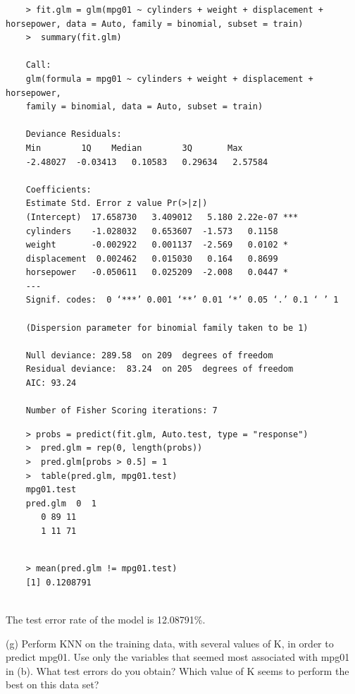 \documentclass{article}
\begin{document}
\begin{program}
	\begin{verbatim}	
	> fit.glm = glm(mpg01 ~ cylinders + weight + displacement + horsepower, data = Auto, family = binomial, subset = train)
	>  summary(fit.glm)
	
	Call:
	glm(formula = mpg01 ~ cylinders + weight + displacement + horsepower, 
	family = binomial, data = Auto, subset = train)
	
	Deviance Residuals: 
	Min        1Q    Median        3Q       Max  
	-2.48027  -0.03413   0.10583   0.29634   2.57584  
	
	Coefficients:
	Estimate Std. Error z value Pr(>|z|)    
	(Intercept)  17.658730   3.409012   5.180 2.22e-07 ***
	cylinders    -1.028032   0.653607  -1.573   0.1158    
	weight       -0.002922   0.001137  -2.569   0.0102 *  
	displacement  0.002462   0.015030   0.164   0.8699    
	horsepower   -0.050611   0.025209  -2.008   0.0447 *  
	---
	Signif. codes:  0 ‘***’ 0.001 ‘**’ 0.01 ‘*’ 0.05 ‘.’ 0.1 ‘ ’ 1
	
	(Dispersion parameter for binomial family taken to be 1)
	
	Null deviance: 289.58  on 209  degrees of freedom
	Residual deviance:  83.24  on 205  degrees of freedom
	AIC: 93.24
	
	Number of Fisher Scoring iterations: 7	
	\end{verbatim}
\end{program}

\begin{program}
	\begin{verbatim}	
	> probs = predict(fit.glm, Auto.test, type = "response")
	>  pred.glm = rep(0, length(probs))
	>  pred.glm[probs > 0.5] = 1
	>  table(pred.glm, mpg01.test)
    mpg01.test
	pred.glm  0  1
       0 89 11
       1 11 71
		
	\end{verbatim}
\end{program}

\begin{program}
	\begin{verbatim}	
	> mean(pred.glm != mpg01.test)
	[1] 0.1208791
	
	\end{verbatim}
\end{program}
The test error rate of the model is 12.08791\%.


\newpage
(g) Perform KNN on the training data, with several values of K, in order to predict mpg01. Use only the variables that seemed most associated with mpg01 in (b). What test errors do you obtain? Which value of K seems to perform the best on this data set?
\end{document}
